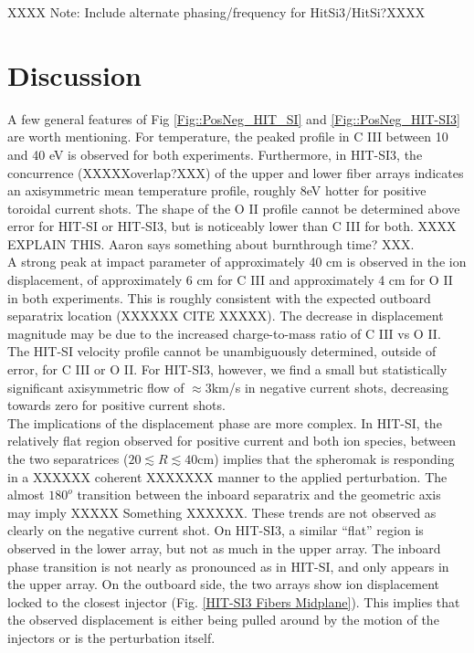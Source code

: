 \documentclass{AIAA}
\begin{document}
XXXX Note: Include alternate phasing/frequency for HitSi3/HitSi?XXXX



\section{Discussion}
\hspace{4ex}A few general features of Fig  \ref{Fig::PosNeg_HIT_SI} and \ref{Fig::PosNeg_HIT-SI3} are worth mentioning. For temperature, the peaked profile in C III between 10 and 40 eV  is observed for both experiments. Furthermore, in HIT-SI3, the concurrence (XXXXXoverlap?XXX) of the upper and lower fiber arrays indicates an axisymmetric mean temperature profile, roughly 8eV hotter for positive toroidal current shots. The shape of the O II profile cannot be determined above error for HIT-SI or HIT-SI3, but is noticeably lower than C III for both. XXXX EXPLAIN THIS. Aaron says something about burnthrough time? XXX. \\
\hspace*{4ex}A strong peak at impact parameter of approximately 40 cm is observed in the ion displacement, of approximately 6 cm for C III and approximately 4 cm for O II in both experiments. This is roughly consistent with the expected outboard separatrix location (XXXXXX CITE XXXXX). The decrease in displacement magnitude may be due to the increased charge-to-mass ratio of C III vs O II.\\
\hspace*{4ex}The HIT-SI velocity profile cannot be unambiguously determined, outside of error, for C III or O II. For HIT-SI3, however, we find a small but statistically significant axisymmetric flow of $\approx3$km/s in negative current shots, decreasing towards zero for positive current shots.\\
\hspace*{4ex}The implications of the displacement phase are more complex. In HIT-SI, the relatively flat region observed for positive current and both ion species, between the two separatrices ($20\lesssim{R}\lesssim40$cm) implies that the spheromak is responding in a XXXXXX coherent XXXXXXX manner to the applied perturbation. The almost $180^o$ transition between the inboard separatrix and the geometric axis may imply XXXXX Something XXXXXX. These trends are not observed as clearly on the negative current shot. On HIT-SI3, a similar ``flat'' region is observed in the lower array, but not as much in the upper array. The inboard phase transition is not nearly as pronounced as in HIT-SI, and only appears in the upper array. On the outboard side, the two arrays show ion displacement locked to the closest injector (Fig. \ref{HIT-SI3 Fibers Midplane}). This implies that the observed displacement is either being pulled around by the motion of the injectors or is the perturbation itself. 
\end{document}
